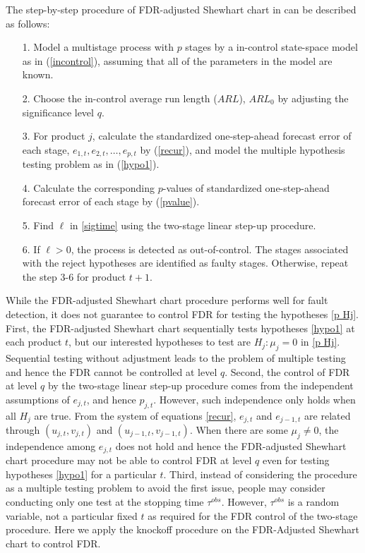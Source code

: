 \documentclass[]{interact}
\theoremstyle{plain}%
\theoremstyle{definition}
\theoremstyle{remark}
\providecommand{\tightlist}{%
  \setlength{\itemsep}{0pt}\setlength{\parskip}{0pt}}
\begin{document}
The step-by-step procedure of FDR-adjusted Shewhart chart in \cite{li2009false} can be described as follows:
\begin{itemize}
\tightlist
\item[1.] 
Model a multistage process with $p$ stages by a in-control state-space model as in (\ref{incontrol}), assuming that all of the parameters in the model are known.
\item[2.]
Choose the in-control average run length ($ARL$), $ARL_0$ by adjusting the significance level $q$.
\item[3.]
For product $j$, calculate the standardized one-step-ahead forecast error of each stage, $e_{1,t}, e_{2,t}, \ldots , e_{p,t}$ by (\ref{recur}), and model the multiple hypothesis testing problem as in (\ref{hypo1}).
\item[4.]
Calculate the corresponding $p$-values of standardized one-step-ahead forecast error of each stage by (\ref{pvalue}).
\item[5.]
Find $\ell$ in \eqref{sigtime} using the two-stage linear step-up procedure.
\item[6.]
If $\ell > 0$, the process is detected as out-of-control. The stages associated with the reject hypotheses are identified as faulty stages. Otherwise, repeat the step 3-6 for product $t+1$.
\end{itemize}
While the FDR-adjusted Shewhart chart procedure performs well for fault detection, it does not guarantee to control FDR for testing the hypotheses \eqref{p Hj}. First, the FDR-adjusted Shewhart chart sequentially tests hypotheses \eqref{hypo1} at each product $t$, but our interested hypotheses to test are $H_j:\mu_j=0$ in \eqref{p Hj}. Sequential testing without adjustment leads to the problem of multiple testing and hence the FDR cannot be controlled at level $q$. Second, the control of FDR at level $q$ by the two-stage linear step-up procedure comes from the independent assumptions of $e_{j,t}$, and hence $p_{j,t}$. However, such independence only holds when all $H_j$ are true. From the system of equations \eqref{recur}, $e_{j,t}$ and $e_{j-1,t}$ are related through $(u_{j,t},v_{j,t})$ and $(u_{j-1,t},v_{j-1,t})$. When there are some $\mu_j\neq 0$, the independence among $e_{j,t}$ does not hold and hence the FDR-adjusted Shewhart chart procedure may not be able to control FDR at level $q$ even for testing hypotheses \eqref{hypo1} for a particular $t$. Third, instead of considering the procedure as a multiple testing problem to avoid the first issue, people may consider conducting only one test at the stopping time $\tau^{obs}$. However, $\tau^{obs}$ is a random variable, not a particular fixed $t$ as required for the FDR control of the two-stage procedure. Here we apply the knockoff procedure on the FDR-Adjusted Shewhart chart to control FDR. 
\end{document}
